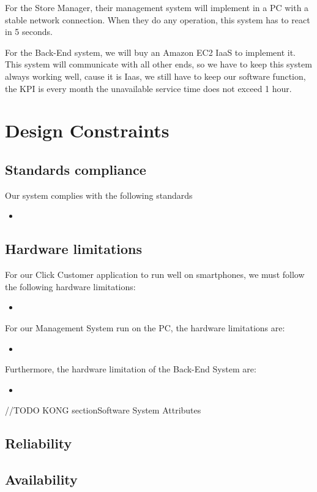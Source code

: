 \documentclass[a4paper,12pt]{report}
\begin{document}
For the Store Manager, their management system will implement in a PC with a stable network connection. When they do any operation, this system has to react in 5 seconds.

For the Back-End system, we will buy an Amazon EC2 IaaS to implement it. This system will communicate with all other ends, so we have to keep this system always working well, cause it is Iaas, we still have to keep our software function, the KPI is every month the unavailable service time does not exceed 1 hour.


\section{Design Constraints}
\subsection{Standards compliance}

Our system complies with the following standards
\begin{itemize}
	\item 
\end{itemize}


\subsection{Hardware limitations}

For our Click Customer application to run well on smartphones, we must follow the following hardware limitations:
\begin{itemize}
	\item 
\end{itemize}

For our Management System run on the PC, the hardware limitations are:
\begin{itemize}
	\item 
\end{itemize}

Furthermore, the hardware limitation of the Back-End System are:
\begin{itemize}
	\item 
\end{itemize}


//TODO KONG
section{Software System Attributes}
\subsection{Reliability}
\subsection{Availability}
\end{document}
